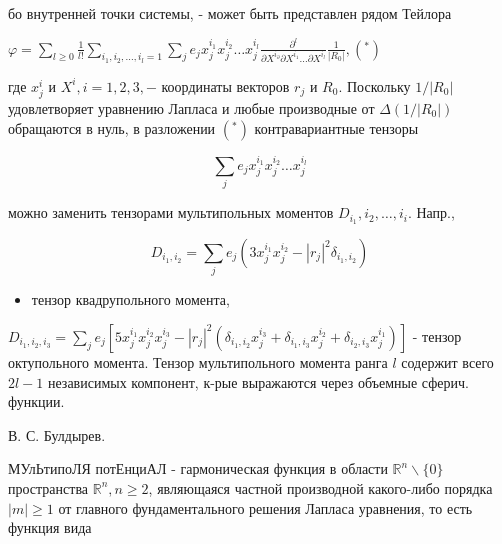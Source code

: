 \documentclass[10pt]{article}
\begin{document}
бо внутренней точки системы, - может быть представлен рядом Тейлора



$\varphi=\sum_{l \geqslant 0} \frac{1}{l !} \sum_{i_{1}, i_{2}, \ldots, i_{l}=1} \sum_{j} e_{j} x_{j}^{i_{1}} x_{j}^{i_{2}} \ldots x_{j}^{i_{l}} \frac{\partial^{l}}{\partial X^{i_{\partial}} \partial X^{i_{1}} \ldots \partial X^{i_{l}}} \frac{1}{\left|R_{0}\right|},\left(^{*}\right)$



где $x_{j}^{i}$ и $X^{i}, i=1,2,3,-$ координаты векторов $r_{j}$ и $R_{0}$. Поскольку $1 /\left|R_{0}\right|$ удовлетворяет уравнению Лапласа и любые производные от $\Delta\left(1 /\left|R_{0}\right|\right)$ обращаются в нуль, в разложении $\left({ }^{*}\right)$ контравариантные тензоры



\[

\sum_{j} e_{j} x_{j}^{i_{1}} x_{j}^{i_{2}} \ldots x_{j}^{i_{l}}

\]



можно заменить тензорами мультипольных моментов $D_{i_{1}}, i_{2}, \ldots, i_{i}$. Напр.,



\[

D_{i_{1}, i_{2}}=\sum_{j} e_{j}\left(3 x_{j}^{i_{1}} x_{j}^{i_{2}}-\left|r_{j}\right|^{2} \delta_{i_{1}, i_{2}}\right)

\]



\begin{itemize}

  \item тензор квадрупольного момента,

\end{itemize}



$D_{i_{1}, i_{2}, i_{3}}=\sum_{j} e_{j}\left[5 x_{j}^{i_{1}} x_{j}^{i_{2}} x_{j}^{i_{3}}-\left|r_{j}\right|^{2}\left(\delta_{i_{1}, i_{2}} x_{j}^{i_{3}}+\delta_{i_{1}, i_{3}} x_{j}^{i_{2}}+\delta_{i_{2}, i_{3}} x_{j}^{i_{1}}\right)\right]$ - тензор октупольного момента. Тензор мультипольного момента ранга $l$ содержит всего $2 l-1$ независимых компонент, к-рые выражаются через объемные сферич. функции.



В. С. Булдырев.



МУлЬтипоЛЯ потЕнциАЛ - гармоническая функция в области $\mathbb{R}^{n} \backslash\{0\}$ пространства $\mathbb{R}^{n}, n \geqslant 2$, являющаяся частной производной какого-либо порядка $|m| \geqslant 1$ от главного фундаментального решения Лапласа уравнения, то есть функция вида
\end{document}
